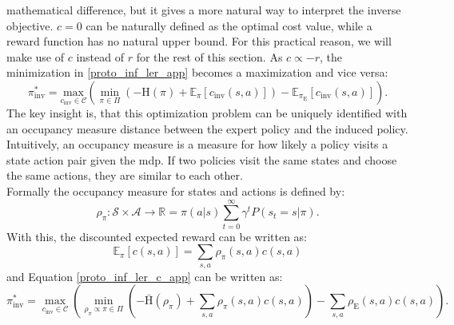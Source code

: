 mathematical difference, but it gives a more natural way to interpret the inverse objective. $c=0$ can be naturally defined as the optimal cost value, while a reward function has 
no natural upper bound. For this practical reason, we will make use of $c$ instead of $r$ for the rest of this section. As $c \propto -r$, the minimization in 
\ref{proto_inf_ler_app} becomes a maximization and vice versa:
\begin{equation}
    \label{proto_inf_ler_c_app}
    \pi_{\text{inv}}^* = \underset{c_{\text{inv}} \in \mathcal{C}}{\text{max}} \left( \min_{\pi \in \Pi} \left(- \text{H}(\pi) + \mathbb{E}_{\pi}[c_{\text{inv}}(s, a)] \right) - \mathbb{E}_{\pi_{\text{E}}}[c_{\text{inv}}(s,a)] \right).
\end{equation}
The key insight is, that this optimization problem can be uniquely identified with an occupancy measure distance between the expert policy and the 
induced policy. Intuitively, an occupancy measure is a measure for how likely a policy visits a state action pair given the \ac{mdp}. If two policies visit the same 
states and choose the same actions, they are similar to each other.\\
Formally the occupancy measure for states and actions is defined by: 
\begin{equation*}
    \rho_{\pi}:\mathcal{S} \times \mathcal{A} \rightarrow \mathbb{R} = \pi(a|s)\sum_{t=0}^\infty \gamma^tP(s_t=s|\pi).
\end{equation*}
With this, the discounted expected reward can be written as:
\begin{equation}
    \mathbb{E}_\pi[c(s,a)] = \sum_{s,a} \rho_\pi(s,a) c(s,a)
\end{equation}
and Equation \ref{proto_inf_ler_c_app} can be written as:
\begin{equation}
    \label{occ_meas_obj_app}
    \pi_{\text{inv}}^* = \max_{c_{\text{inv}} \in \mathcal{C}} \left( \min_{\rho_\pi \propto \pi \in \Pi} \left(- \bar{\text{H}}(\rho_\pi) + \sum_{s,a} \rho_\pi(s,a) c(s,a) \right) - \sum_{s,a} \rho_{\text{E}}(s,a) c(s,a) \right).
\end{equation}

